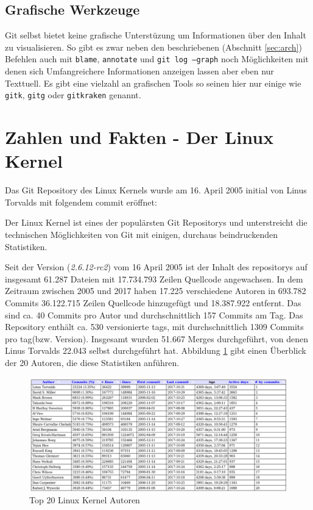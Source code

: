 \subsection{Grafische Werkzeuge}
Git selbst bietet keine grafische Unterstüzung um Informationen über den Inhalt
zu visualisieren. So gibt es zwar neben den beschriebenen (Abschnitt
\ref{sec:arch}) Befehlen auch mit \texttt{blame}, \texttt{annotate} und
\texttt{git log --graph} noch Möglichkeiten mit denen sich Umfangreichere
Informationen anzeigen lassen aber eben nur Texttuell\cite[S.~302]{gitwf}. Es
gibt eine vielzahl an grafischen Tools so seinen hier nur einige wie
\texttt{gitk}, \texttt{gitg} oder \texttt{gitkraken} genannt.

\section{Zahlen und Fakten - Der Linux Kernel}\label{sec:kernel}
Das Git Repository des Linux Kernels wurde am 16. April 2005 initial von Linus
Torvalds mit folgendem \gls{commit}\cite{link:linuxgit} eröffnet:



Der Linux Kernel ist eines der populärsten Git Repositorys und unterstreicht
die technischen Möglichkeiten von Git mit einigen, durchaus beindruckenden
Statistiken.

Seit der Version (\textit{2.6.12-rc2}) vom 16 April 2005 ist der Inhalt des
\glspl{repository} auf insgesamt 61.287 Dateien mit 17.734.793 Zeilen Quellcode
angewachsen. In dem Zeitraum zwischen 2005 und 2017 haben 17.225 verschiedene
Autoren in 693.782 Commits 36.122.715 Zeilen Quellcode hinzugefügt und
18.387.922 entfernt. Das sind ca. 40 Commits pro Autor und durchschnittlich
157 Commits am Tag. Das Repository enthält ca. 530 versionierte \glspl{tag},
mit durchschnittlich 1309 Commits pro \gls{tag}(bzw. Version). Insgesamt wurden
51.667 Merges durchgeführt, von denen Linus Torvalds 22.043 selbst durchgeführt
hat. Abbildung \ref{top20} gibt einen Überblick der 20 Autoren, die diese
Statistiken anführen.

\begin{figure}
	\centering
  \includegraphics[scale=0.40]{images/top_20_of_linux_authors.png}
	\caption{Top 20 Linux Kernel Autoren}
	\label{top20}
\end{figure}

